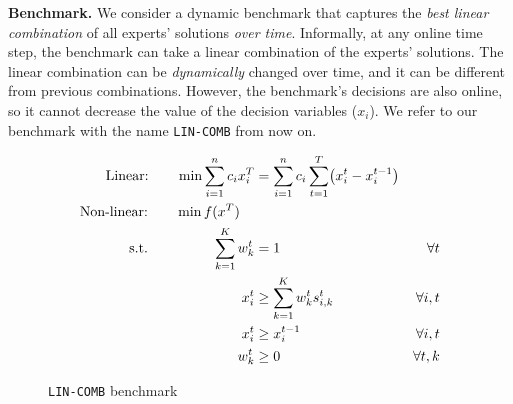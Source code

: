 
\noindent \textbf{Benchmark.}
We consider a dynamic benchmark that captures the \emph{best linear combination} of all experts' solutions \emph{over time}.
Informally, at any online time step, the benchmark can take a linear combination of the experts' solutions.
The linear combination can be \emph{dynamically} changed over time, and it can be different from previous combinations.
However, the benchmark's decisions are also online, so it cannot decrease the value of the decision variables ($x_{i}$).
We refer to our benchmark with the name \texttt{LIN-COMB} from now on.

\begin{figure}
	\vspace{-0.5cm}
	\begin{mdframed}
	\vspace{-0.2cm}
		\begin{align*}
			\text{Linear:}  \qquad \min \sum_{i=1}^{n} c_{i} x_{i}^{T} &= \sum_{i=1}^{n} c_{i} \sum_{t=1}^{T}\bigl( x_{i}^{t} - x_{i}^{t-1}\bigr) & \\
			\text{Non-linear:} \qquad \min f(x^{T}) \hspace{0.37cm} & & \\
			\text{s.t.} \hspace{1.63cm}
			\sum_{k=1}^{K} w_{k}^{t} &= 1 \qquad &\forall t \\
			\qquad x_{i}^{t} &\geq \sum_{k=1}^{K} w_{k}^{t} s_{i,k}^{t}  \qquad &\forall i, t\\
			\qquad x_{i}^{t} &\geq x_{i}^{t-1} \qquad &\forall i, t \\
			\qquad w_{k}^{t} &\geq 0 \qquad &\forall t, k
		\end{align*}
	\end{mdframed}
	\vspace{-0.2cm}
	\caption{\texttt{LIN-COMB} benchmark}
	\label{fig:benchmark}
	\vspace{-0.5cm}
\end{figure}

